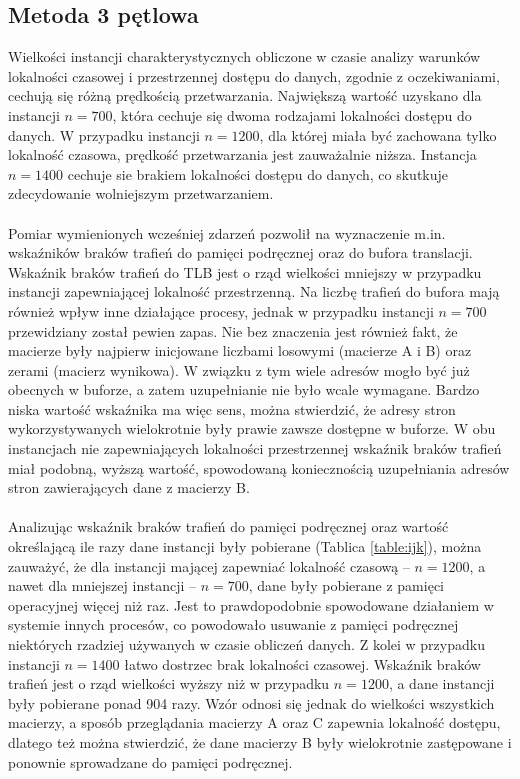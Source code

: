 \documentclass[12pt,a4paper]{article}
\begin{document}
\subsection{Metoda 3 pętlowa}

Wielkości instancji charakterystycznych obliczone w czasie analizy warunków lokalności czasowej i przestrzennej dostępu do danych, zgodnie z oczekiwaniami, cechują się różną prędkością przetwarzania. Największą wartość uzyskano dla instancji $n=700$, która cechuje się dwoma rodzajami lokalności  dostępu do danych. W przypadku instancji $n=1200$, dla której miała być zachowana tylko lokalność czasowa, prędkość przetwarzania jest zauważalnie niższa. Instancja $n=1400$ cechuje sie brakiem lokalności dostępu do danych, co skutkuje zdecydowanie wolniejszym przetwarzaniem.\\
\\
Pomiar wymienionych wcześniej zdarzeń pozwolił na wyznaczenie m.in. wskaźników braków trafień do pamięci podręcznej oraz do bufora translacji. Wskaźnik braków trafień do TLB jest o rząd wielkości mniejszy w przypadku instancji zapewniającej lokalność przestrzenną. Na liczbę trafień do bufora mają również wpływ inne działające procesy, jednak w przypadku instancji $n=700$ przewidziany został pewien zapas. Nie bez znaczenia jest również fakt, że macierze były najpierw inicjowane liczbami losowymi (macierze A i B) oraz zerami (macierz wynikowa). W związku z tym wiele adresów mogło być już obecnych w buforze, a zatem uzupełnianie nie było wcale wymagane. Bardzo niska wartość wskaźnika ma więc sens, można stwierdzić, że adresy stron wykorzystywanych wielokrotnie były prawie zawsze dostępne w buforze. W obu instancjach nie zapewniających lokalności przestrzennej wskaźnik braków trafień miał podobną, wyższą wartość, spowodowaną koniecznością uzupełniania adresów stron zawierających dane z macierzy B.\\
\\
Analizując wskaźnik braków trafień do pamięci podręcznej oraz wartość określającą ile razy dane instancji były pobierane (Tablica \ref{table:ijk}), można zauważyć, że dla instancji mającej zapewniać lokalność czasową -- $n=1200$, a nawet dla mniejszej instancji -- $n=700$, dane były pobierane z pamięci operacyjnej więcej niż raz. Jest to prawdopodobnie spowodowane działaniem w systemie innych procesów, co powodowało usuwanie z pamięci podręcznej niektórych rzadziej używanych w czasie obliczeń danych. Z kolei w przypadku instancji $n=1400$ łatwo dostrzec brak lokalności czasowej. Wskaźnik braków trafień jest o rząd wielkości wyższy niż w przypadku $n=1200$, a dane instancji były pobierane ponad 904 razy. Wzór odnosi się jednak do wielkości wszystkich macierzy, a sposób przeglądania macierzy A oraz C zapewnia lokalność dostępu, dlatego też można stwierdzić, że dane macierzy B były wielokrotnie zastępowane i ponownie sprowadzane do pamięci podręcznej.\\
\end{document}

